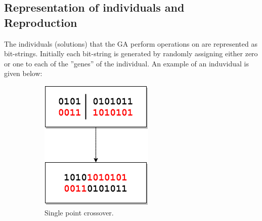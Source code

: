 \documentclass{article}
\begin{document}
\subsection{Representation of individuals and Reproduction}
The individuals (solutions) that the GA perform operations on are represented as bit-strings. Initially each bit-string is generated by randomly assigning either zero or one to each of the ''genes'' of the individual. An example of an induvidual is given below:


\begin{figure}[h!]
    \centering
    \begin{subfigure}[b]{0.3\textwidth}
        \includegraphics[width=\textwidth]{"Single Point Crossover"}
        \caption{Single point crossover.}
        \label{fig:gull}
    \end{subfigure}
    ~ %
    \begin{subfigure}[b]{0.3\textwidth}

\end{subfigure}
\end{figure}
\end{document}
